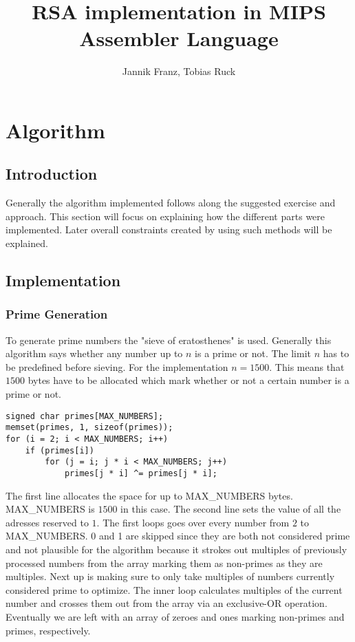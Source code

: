 \documentclass{report}
\title{RSA implementation in MIPS Assembler Language}
\author{Jannik Franz, Tobias Ruck}
\begin{document}
\maketitle
\setcounter{chapter}{1}
\section{Algorithm}
\subsection{Introduction}
Generally the algorithm implemented follows along the suggested exercise and approach. This section will focus on explaining how the different parts were implemented. Later overall constraints created by using such methods will be explained.
\subsection{Implementation}
\subsubsection{Prime Generation}
To generate prime numbers the "sieve of eratosthenes" is used. Generally this algorithm says whether any number up to $n$ is a prime or not. The limit $n$ has to be predefined before sieving. For the implementation $n = 1500$. This means that $1500$ bytes have to be allocated which mark whether or not a certain number is a prime or not.
\begin{lstlisting}
signed char primes[MAX_NUMBERS];
memset(primes, 1, sizeof(primes));
for (i = 2; i < MAX_NUMBERS; i++)
	if (primes[i])
		for (j = i; j * i < MAX_NUMBERS; j++)
			primes[j * i] ^= primes[j * i];
\end{lstlisting}
The first line allocates the space for up to MAX\_NUMBERS bytes. MAX\_NUMBERS is $1500$ in this case. The second line sets the value of all the adresses reserved to $1$. The first loops goes over every number from $2$ to MAX\_NUMBERS. 0 and 1 are skipped since they are both not considered prime and not plausible for the algorithm because it strokes out multiples of previously processed numbers from the array marking them as non-primes as they are multiples. Next up is making sure to only take multiples of numbers currently considered prime to optimize. The inner loop calculates multiples of the current number and crosses them out from the array via an exclusive-OR operation. Eventually we are left with an array of zeroes and ones marking non-primes and primes, respectively.
\end{document}
